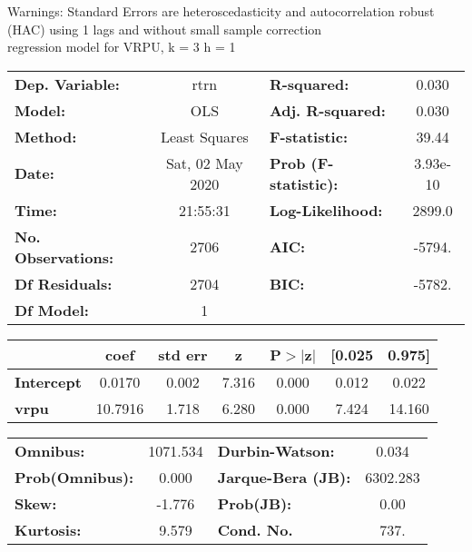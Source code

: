 Warnings: \newline
 [1] Standard Errors are heteroscedasticity and autocorrelation robust (HAC) using 1 lags and without small sample correction\\ 

regression model for VRPU, k = 3 h = 1\begin{center}
\begin{tabular}{lclc}
\toprule
\textbf{Dep. Variable:}    &       rtrn       & \textbf{  R-squared:         } &     0.030   \\
\textbf{Model:}            &       OLS        & \textbf{  Adj. R-squared:    } &     0.030   \\
\textbf{Method:}           &  Least Squares   & \textbf{  F-statistic:       } &     39.44   \\
\textbf{Date:}             & Sat, 02 May 2020 & \textbf{  Prob (F-statistic):} &  3.93e-10   \\
\textbf{Time:}             &     21:55:31     & \textbf{  Log-Likelihood:    } &    2899.0   \\
\textbf{No. Observations:} &        2706      & \textbf{  AIC:               } &    -5794.   \\
\textbf{Df Residuals:}     &        2704      & \textbf{  BIC:               } &    -5782.   \\
\textbf{Df Model:}         &           1      & \textbf{                     } &             \\
\bottomrule
\end{tabular}
\begin{tabular}{lcccccc}
                   & \textbf{coef} & \textbf{std err} & \textbf{z} & \textbf{P$> |$z$|$} & \textbf{[0.025} & \textbf{0.975]}  \\
\midrule
\textbf{Intercept} &       0.0170  &        0.002     &     7.316  &         0.000        &        0.012    &        0.022     \\
\textbf{vrpu}      &      10.7916  &        1.718     &     6.280  &         0.000        &        7.424    &       14.160     \\
\bottomrule
\end{tabular}
\begin{tabular}{lclc}
\textbf{Omnibus:}       & 1071.534 & \textbf{  Durbin-Watson:     } &    0.034  \\
\textbf{Prob(Omnibus):} &   0.000  & \textbf{  Jarque-Bera (JB):  } & 6302.283  \\
\textbf{Skew:}          &  -1.776  & \textbf{  Prob(JB):          } &     0.00  \\
\textbf{Kurtosis:}      &   9.579  & \textbf{  Cond. No.          } &     737.  \\
\bottomrule
\end{tabular}
\end{center}

